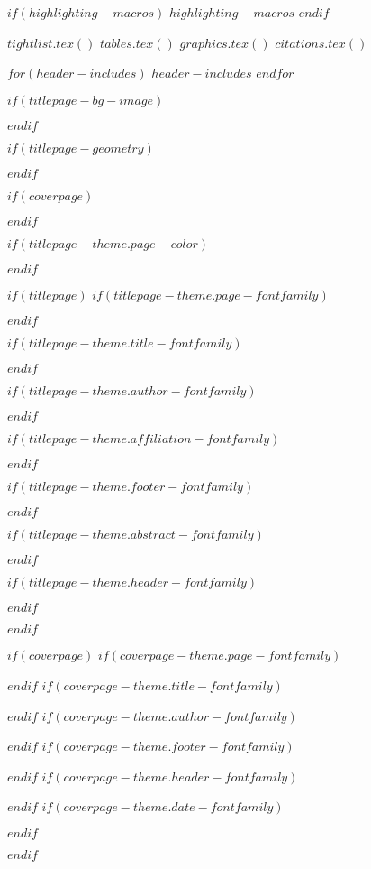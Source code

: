 $if(highlighting-macros)$
$highlighting-macros$
$endif$

$tightlist.tex()$
$tables.tex()$
$graphics.tex()$
$citations.tex()$

$for(header-includes)$
$header-includes$
$endfor$

\usepackage{hyphenat}
\usepackage{ifthen}
\usepackage{calc}
\usepackage{calculator}

$if(titlepage-bg-image)$
\usepackage{graphicx}
\usepackage{wallpaper}
$endif$

$if(titlepage-geometry)$
\usepackage{geometry}
$endif$

$if(coverpage)$
\usepackage{graphicx}
\usepackage{geometry}
\usepackage{afterpage}
\usepackage{tikz}
\usetikzlibrary{calc}
\usetikzlibrary{fadings}
\usepackage[pagecolor=none]{pagecolor}
$endif$

$if(titlepage-theme.page-color)$
\usepackage[pagecolor=none]{pagecolor}
$endif$

$if(titlepage)$
$if(titlepage-theme.page-fontfamily)$
\usepackage{fontspec}
$endif$

$if(titlepage-theme.title-fontfamily)$
\usepackage{fontspec}
$endif$

$if(titlepage-theme.author-fontfamily)$
\usepackage{fontspec}
$endif$

$if(titlepage-theme.affiliation-fontfamily)$
\usepackage{fontspec}
$endif$

$if(titlepage-theme.footer-fontfamily)$
\usepackage{fontspec}
$endif$

$if(titlepage-theme.abstract-fontfamily)$
\usepackage{fontspec}
$endif$

$if(titlepage-theme.header-fontfamily)$
\usepackage{fontspec}
$endif$

$endif$

$if(coverpage)$
$if(coverpage-theme.page-fontfamily)$
\usepackage{fontspec}
$endif$
$if(coverpage-theme.title-fontfamily)$
\usepackage{fontspec}
$endif$
$if(coverpage-theme.author-fontfamily)$
\usepackage{fontspec}
$endif$
$if(coverpage-theme.footer-fontfamily)$
\usepackage{fontspec}
$endif$
$if(coverpage-theme.header-fontfamily)$
\usepackage{fontspec}
$endif$
$if(coverpage-theme.date-fontfamily)$
\usepackage{fontspec}
$endif$

$endif$

